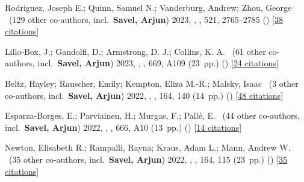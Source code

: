 \item[{\color{numcolor}\scriptsize17}] Rodriguez, Joseph E.; Quinn, Samuel N.; Vanderburg, Andrew; Zhou, George \etal{}\ ({129} other co-authors, incl.\ \textbf{Savel, Arjun}) 2023, , \mnras, {521}, 2765--2785 () [\href{https://ui.adsabs.harvard.edu/abs/2023MNRAS.521.2765R}{38 citations}]

\item[{\color{numcolor}\scriptsize16}] Lillo-Box, J.; Gandolfi, D.; Armstrong, D. J.; Collins, K. A. \etal{}\ ({61} other co-authors, incl.\ \textbf{Savel, Arjun}) 2023, , \aanda, {669}, A109 (23~pp.) () [\href{https://ui.adsabs.harvard.edu/abs/2023A&A...669A.109L}{24 citations}]

\item[{\color{numcolor}\scriptsize15}] Beltz, Hayley; Rauscher, Emily; Kempton, Eliza M.-R.; Malsky, Isaac \etal{}\ ({3} other co-authors, incl.\ \textbf{Savel, Arjun}) 2022, , \aj, {164}, 140 (14~pp.) () [\href{https://ui.adsabs.harvard.edu/abs/2022AJ....164..140B}{48 citations}]

\item[{\color{numcolor}\scriptsize14}] Esparza-Borges, E.; Parviainen, H.; Murgas, F.; Pall{\'e}, E. \etal{}\ ({44} other co-authors, incl.\ \textbf{Savel, Arjun}) 2022, , \aanda, {666}, A10 (13~pp.) () [\href{https://ui.adsabs.harvard.edu/abs/2022A&A...666A..10E}{14 citations}]

\item[{\color{numcolor}\scriptsize13}] Newton, Elisabeth R.; Rampalli, Rayna; Kraus, Adam L.; Mann, Andrew W. \etal{}\ ({35} other co-authors, incl.\ \textbf{Savel, Arjun}) 2022, , \aj, {164}, 115 (23~pp.) () [\href{https://ui.adsabs.harvard.edu/abs/2022AJ....164..115N}{35 citations}]

